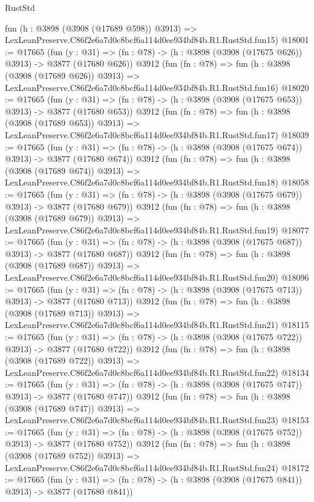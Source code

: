 \begin{lexlean}{RustStd}
\begin{coremodule}
    fun (h : @3898 (@3908 (@17689 @598)) @3913) =>
    LexLeanPreserve.C86f2e6a7d0c8bcf6a114d0ee934bf84b.R1.RustStd.fun15)
@18001 := @17665
    (fun (y : @31) => (fn : @78) -> (h : @3898 (@3908 (@17675 @626)) @3913) -> @3877 (@17680 @626))
    @3912
    (fun (fn : @78) =>
    fun (h : @3898 (@3908 (@17689 @626)) @3913) =>
    LexLeanPreserve.C86f2e6a7d0c8bcf6a114d0ee934bf84b.R1.RustStd.fun16)
@18020 := @17665
    (fun (y : @31) => (fn : @78) -> (h : @3898 (@3908 (@17675 @653)) @3913) -> @3877 (@17680 @653))
    @3912
    (fun (fn : @78) =>
    fun (h : @3898 (@3908 (@17689 @653)) @3913) =>
    LexLeanPreserve.C86f2e6a7d0c8bcf6a114d0ee934bf84b.R1.RustStd.fun17)
@18039 := @17665
    (fun (y : @31) => (fn : @78) -> (h : @3898 (@3908 (@17675 @674)) @3913) -> @3877 (@17680 @674))
    @3912
    (fun (fn : @78) =>
    fun (h : @3898 (@3908 (@17689 @674)) @3913) =>
    LexLeanPreserve.C86f2e6a7d0c8bcf6a114d0ee934bf84b.R1.RustStd.fun18)
@18058 := @17665
    (fun (y : @31) => (fn : @78) -> (h : @3898 (@3908 (@17675 @679)) @3913) -> @3877 (@17680 @679))
    @3912
    (fun (fn : @78) =>
    fun (h : @3898 (@3908 (@17689 @679)) @3913) =>
    LexLeanPreserve.C86f2e6a7d0c8bcf6a114d0ee934bf84b.R1.RustStd.fun19)
@18077 := @17665
    (fun (y : @31) => (fn : @78) -> (h : @3898 (@3908 (@17675 @687)) @3913) -> @3877 (@17680 @687))
    @3912
    (fun (fn : @78) =>
    fun (h : @3898 (@3908 (@17689 @687)) @3913) =>
    LexLeanPreserve.C86f2e6a7d0c8bcf6a114d0ee934bf84b.R1.RustStd.fun20)
@18096 := @17665
    (fun (y : @31) => (fn : @78) -> (h : @3898 (@3908 (@17675 @713)) @3913) -> @3877 (@17680 @713))
    @3912
    (fun (fn : @78) =>
    fun (h : @3898 (@3908 (@17689 @713)) @3913) =>
    LexLeanPreserve.C86f2e6a7d0c8bcf6a114d0ee934bf84b.R1.RustStd.fun21)
@18115 := @17665
    (fun (y : @31) => (fn : @78) -> (h : @3898 (@3908 (@17675 @722)) @3913) -> @3877 (@17680 @722))
    @3912
    (fun (fn : @78) =>
    fun (h : @3898 (@3908 (@17689 @722)) @3913) =>
    LexLeanPreserve.C86f2e6a7d0c8bcf6a114d0ee934bf84b.R1.RustStd.fun22)
@18134 := @17665
    (fun (y : @31) => (fn : @78) -> (h : @3898 (@3908 (@17675 @747)) @3913) -> @3877 (@17680 @747))
    @3912
    (fun (fn : @78) =>
    fun (h : @3898 (@3908 (@17689 @747)) @3913) =>
    LexLeanPreserve.C86f2e6a7d0c8bcf6a114d0ee934bf84b.R1.RustStd.fun23)
@18153 := @17665
    (fun (y : @31) => (fn : @78) -> (h : @3898 (@3908 (@17675 @752)) @3913) -> @3877 (@17680 @752))
    @3912
    (fun (fn : @78) =>
    fun (h : @3898 (@3908 (@17689 @752)) @3913) =>
    LexLeanPreserve.C86f2e6a7d0c8bcf6a114d0ee934bf84b.R1.RustStd.fun24)
@18172 := @17665
    (fun (y : @31) => (fn : @78) -> (h : @3898 (@3908 (@17675 @841)) @3913) -> @3877 (@17680 @841))

\end{coremodule}
\end{lexlean}
